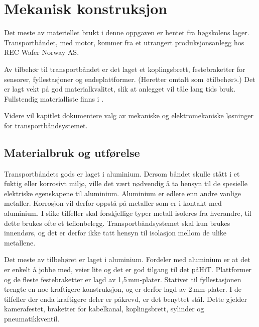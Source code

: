 \documentclass[Visionprosjekt.tex]{subfiles}
\begin{document}
 
  
\section{Mekanisk konstruksjon}



Det meste av materiellet brukt i denne oppgaven er hentet fra høgskolens lager. Transportbåndet, med motor,  kommer fra et utrangert produksjonsanlegg hos REC Wafer Norway AS. 

Av tilbehør til transportbåndet er det laget et koplingsbrett, festebraketter for sensorer, fyllestasjoner og endeplattformer. (Heretter omtalt som «tilbehør».) Det er lagt vekt på god materialkvalitet, slik at anlegget vil tåle lang tids bruk.  Fullstendig materialliste finns i .

Videre vil kapitlet dokumentere valg av mekaniske og elektromekaniske løsninger for transportbåndsystemet.






\subsection{Materialbruk og utførelse}

Transportbåndets gods er laget i aluminium. Dersom båndet skulle stått i et fuktig eller korrosivt miljø, ville det vært nødvendig å ta hensyn til de  spesielle elektriske egenskapene til aluminium. Aluminium er edlere enn andre vanlige metaller. Korrosjon vil derfor oppstå på  metaller som er i kontakt med aluminium.
I slike tilfeller skal forskjellige typer metall isoleres fra hverandre, til dette brukes ofte et teflonbelegg. Transportbåndsystemet skal kun brukes innendørs, og det er derfor ikke tatt hensyn til isolasjon mellom de ulike metallene. %

Det meste av tilbehøret er laget i  aluminium. Fordeler med aluminium er at det er enkelt å jobbe med, veier lite  og det er god tilgang til det påHiT. Plattformer og de fleste festebraketter er lagd av 1,5\,mm-plater. Stativet til fyllestasjonen trengte en noe kraftigere konstruksjon, og er derfor lagd av 2\,mm-plater. 
I de tilfeller der enda kraftigere deler er påkrevd, er det benyttet stål. Dette gjelder kamerafestet, 
braketter for kabelkanal, koplingsbrett, sylinder og pneumatikkventil. 
\end{document}
